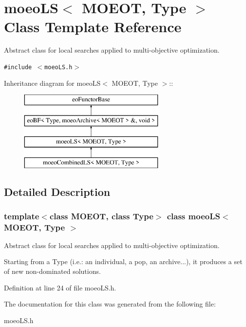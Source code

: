 \section{moeo\-LS$<$ MOEOT, Type $>$ Class Template Reference}
\label{classmoeoLS}
Abstract class for local searches applied to multi-objective optimization.  


{\tt \#include $<$moeo\-LS.h$>$}

Inheritance diagram for moeo\-LS$<$ MOEOT, Type $>$::\begin{figure}[H]
\begin{center}
\leavevmode
\includegraphics[height=4cm]{classmoeoLS}
\end{center}
\end{figure}


\subsection{Detailed Description}
\subsubsection*{template$<$class MOEOT, class Type$>$ class moeo\-LS$<$ MOEOT, Type $>$}

Abstract class for local searches applied to multi-objective optimization. 

Starting from a Type (i.e.: an individual, a pop, an archive...), it produces a set of new non-dominated solutions. 



Definition at line 24 of file moeo\-LS.h.

The documentation for this class was generated from the following file:\begin{CompactItemize}
\item 
moeo\-LS.h\end{CompactItemize}
